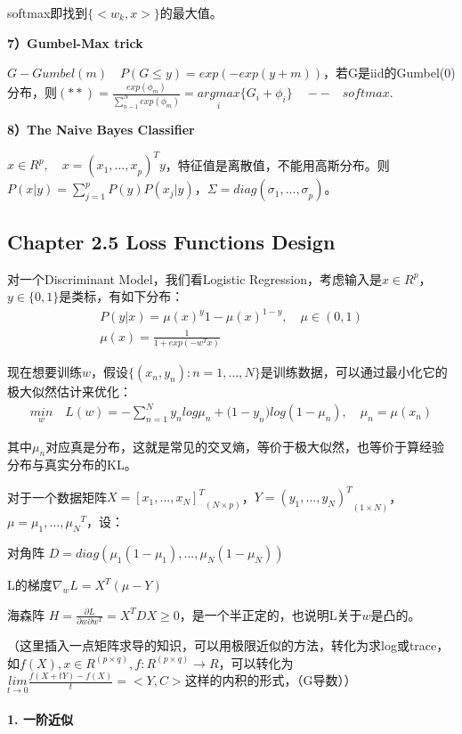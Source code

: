 \documentclass[12pt,UTF8,AutoFakeBold]{article}
\begin{document}
softmax即找到$\{ <{ { w }_{ k } },x>\} $的最大值。

\textbf{7）Gumbel-Max trick}

$G-Gumbel(m)\quad P(G\le y)=exp(-exp(y+m))$，若G是iid的Gumbel(0)分布，则$(**)=\frac { exp({ \phi  }_{ m }) }{ \sum _{ n-1 }^{ N }{ exp({ \phi  }_{ m }) }  } =\underset { i }{ argmax } \{ { G }_{ i }+{ \phi  }_{ i }\} \quad -- \quad softmax$.

\textbf{8）The Naive Bayes Classifier}

${ x }\in { R }^{ p },\quad x={ ({ x }_{ 1 }{ ,...,x }_{ p }) }^{ T }{ y }$，特征值是离散值，不能用⾼斯分布。则$P(x|y)=\sum _{ j=1 }^{ p }{ P(y)P({ x }_{ j }|y) } $，$\Sigma =diag({ \sigma  }_{ 1 }{ ,...,\sigma  }_{ p })$。

\subsection{Chapter 2.5  Loss Functions Design}

对一个Discriminant Model，我们看Logistic Regression，考虑输入是$x\in{R^p}$，$y\in{\{0,1\}}$是类标，有如下分布：
\begin{gather}
P(y|x) = {\mu(x)}^{y}{1-\mu(x)}^{1-y}, \quad {\mu}\in{(0,1)}\\
\mu { (x) }=\frac { 1 }{ 1+exp(-{ w }^{ T }x) } 
\end{gather}

现在想要训练$w$，假设$\{(x_n,y_n):n=1,...,N\}$是训练数据，可以通过最小化它的极大似然估计来优化：
\begin{gather}
\underset { w }{ min } \quad L(w)=-\sum _{ n=1 }^{ N }{ { y }_{ n }log{ \mu  }_{ n }+{ (1-y }_{ n })log(1-{ \mu  }_{ n }) } , \quad \mu_n=\mu(x_n)
\end{gather}

其中$\mu_n$对应真是分布，这就是常见的交叉熵，等价于极大似然，也等价于算经验分布与真实分布的KL。

对于一个数据矩阵$X={{[x_1,...,x_N]}^T}_{(N\times p)}$，$Y={{(y_1,...,y_N)}^T}_{(1\times  N)}$，${\mu} ={\mu_1,...,\mu_N}^T$，设：

对角阵 $D = diag(\mu_1(1-\mu_1),...,\mu_N(1-\mu_N))$

L的梯度$ { \nabla  }_{ w }L={ X }^{ T }(\mu - Y)$

海森阵 $H=\frac { \partial L }{ \partial w\partial { w }^{ T } } ={ X }^{ T }DX \ge 0$，是一个半正定的，也说明L关于$w$是凸的。

（这里插入一点矩阵求导的知识，可以用极限近似的方法，转化为求log或trace，如$f(X),x\in R^{(p\times q)},f:R^{(p\times q)}\rightarrow R$，可以转化为$\underset { t\rightarrow 0 }{ lim } \frac { f(X+tY)-f(X) }{ t } =<Y,C>$这样的内积的形式，（G导数））\\
\\
\textbf{1. 一阶近似}\\
\end{document}
